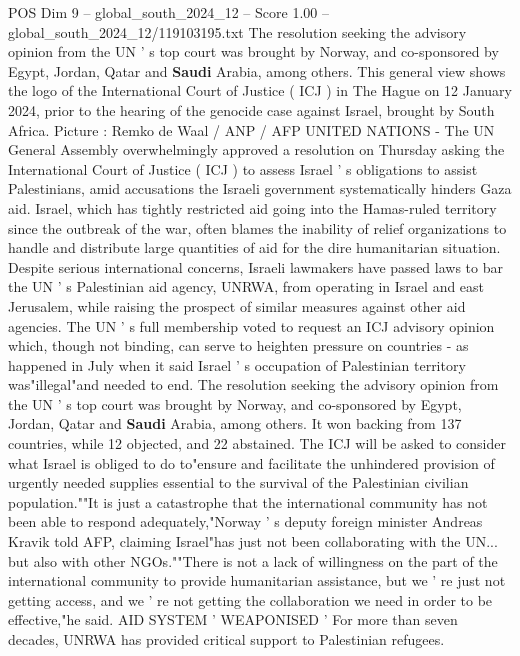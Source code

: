 \begin{textsample}{POS Dim 9 – global\_south\_2024\_12 – Score 1.00 – global\_south\_2024\_12/119103195.txt}  \label{ex:f9_pos_227}
The resolution seeking the advisory opinion from the UN ' s top court was brought by Norway, and co-sponsored by Egypt, Jordan, Qatar and \textbf{Saudi} Arabia, among others.
This general view shows the logo of the International Court of Justice ( ICJ ) in The Hague on 12 January 2024, prior to the hearing of the genocide case against Israel, brought by South Africa.
Picture : Remko de Waal / ANP / AFP UNITED NATIONS - The UN General Assembly overwhelmingly approved a resolution on Thursday asking the International Court of Justice ( ICJ ) to assess Israel ' s obligations to assist Palestinians, amid accusations the Israeli government systematically hinders Gaza aid.
Israel, which has tightly restricted aid going into the Hamas-ruled territory since the outbreak of the war, often blames the inability of relief organizations to handle and distribute large quantities of aid for the dire humanitarian situation.
Despite serious international concerns, Israeli lawmakers have passed laws to bar the UN ' s Palestinian aid agency, UNRWA, from operating in Israel and east Jerusalem, while raising the prospect of similar measures against other aid agencies.
The UN ' s full membership voted to request an ICJ advisory opinion which, though not binding, can serve to heighten pressure on countries - as happened in July when it said Israel ' s occupation of Palestinian territory was"illegal"and needed to end.
The resolution seeking the advisory opinion from the UN ' s top court was brought by Norway, and co-sponsored by Egypt, Jordan, Qatar and \textbf{Saudi} Arabia, among others.
It won backing from 137 countries, while 12 objected, and 22 abstained.
The ICJ will be asked to consider what Israel is obliged to do to"ensure and facilitate the unhindered provision of urgently needed supplies essential to the survival of the Palestinian civilian population.""It is just a catastrophe that the international community has not been able to respond adequately,"Norway ' s deputy foreign minister Andreas Kravik told AFP, claiming Israel"has just not been collaborating with the UN... but also with other NGOs.""There is not a lack of willingness on the part of the international community to provide humanitarian assistance, but we ' re just not getting access, and we ' re not getting the collaboration we need in order to be effective,"he said.
AID SYSTEM ' WEAPONISED ' For more than seven decades, UNRWA has provided critical support to Palestinian refugees.

\end{textsample}
